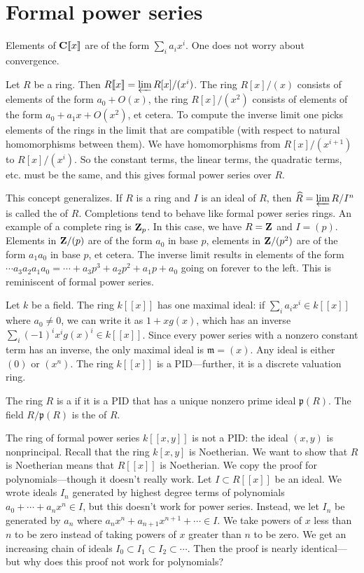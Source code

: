 \documentclass[11pt, oneside,margin=1in]{article}
\begin{document}
\section{Formal power series}
Elements of $\mathbf C[\![x]\!]$ are of the form $\sum_i a_ix^i$. One does not worry about convergence.

Let $R$ be a ring. Then $R[\![x]\!]=\varprojlim R[x]/(x^i)$. The ring $R[x]/(x)$ consists of elements of the form $a_0 + O(x)$, the ring $R[x]/(x^2)$ consists of elements of the form $a_0 + a_1x + O(x^2)$, et cetera. To compute the inverse limit one picks elements of the rings in the limit that are compatible (with respect to natural homomorphisms between them). We have homomorphisms from $R[x]/(x^{i+1})$ to $R[x]/(x^i) $. So the constant terms, the linear terms, the quadratic terms, etc. must be the same, and this gives formal power series over $R$. 

This concept generalizes. If $R$ is a ring and $I$ is an ideal of $R$, then $\widehat{R}=\varprojlim R/I^n$ is called the  of $R$. Completions tend to behave like formal power series rings. An example of a complete ring is $\mathbf Z_p$. In this case, we have $R=\mathbf Z$ and $I = (p)$. Elements in $\mathbf Z/(p)$ are of the form $a_0$ in base $p$, elements in $\mathbf Z/(p^2)$ are of the form $a_1a_0$ in base $p$, et cetera. The inverse limit results in elements of the form $\cdots a_3a_2a_1a_0 = \cdots + a_3p^3 + a_2p^2 + a_1p + a_0$ going on forever to the left. This is reminiscent of formal power series.

Let $k$ be a field. The ring $k[\![x]\!]$ has one maximal ideal: if $\sum_i a_ix^i\in k[\![x]\!]$ where $a_0\ne 0$, we can write it as $1 + xg (x)$, which has an inverse $\sum_i (-1)^i x^i g (x)^i\in k [\![x]\!]$. Since every power series with a nonzero constant term has an inverse, the only maximal ideal is $\mathfrak{m} = (x)$. Any ideal is either $(0)$ or $(x^n)$. The ring $k[\![x]\!]$ is a PID---further, it is a {discrete valuation ring}.

\begin{definition}[ ]\label{}
The ring $R$ is a  if it is a PID that has a unique nonzero prime ideal $\mathfrak{p}(R)$. The field $R/\mathfrak{p}(R)$ is the  of $R$. 
\end{definition}

The ring of formal power series $k[\![x,y]\!]$ is not a PID: the ideal $(x,y)$ is nonprincipal. Recall that the ring $k[x,y]$ is Noetherian. We want to show that $R$ is Noetherian means that $R[\![x]\!]$ is Noetherian. We copy the proof for polynomials---though it doesn't really work. Let $I\subset R[\![x]\!]$ be an ideal. We wrote ideals $I_n$ generated by highest degree terms of polynomials $a_0 + \cdots + a_nx^n\in I$, but this doesn't work for power series. Instead, we let $I_n$ be generated by $a_n$ where $a_nx^n + a_{n+1}x^{n+1} + \cdots \in I$. We take powers of $x$ less than $n$ to be zero instead of taking powers of $x$ greater than $n$ to be zero. We get an increasing chain of ideals $I_0 \subset I_1 \subset I_2 \subset \cdots$. Then the proof is nearly identical---but why does this proof not work for polynomials?
\end{document}
